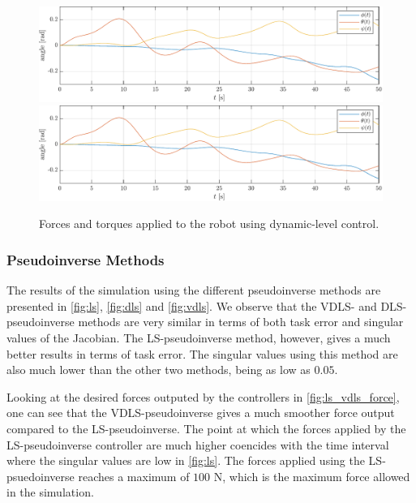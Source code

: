 \begin{figure}[h!]
    \centering
    \includegraphics[page=7,width=\linewidth]{assets/results/dynamic/plot.pdf}
    \includegraphics[page=8,width=\linewidth]{assets/results/dynamic/plot.pdf}
    \caption{Forces and torques applied to the robot using dynamic-level control.}
    \label{fig:dyn:forces}
\end{figure}

\subsubsection{Pseudoinverse Methods}

The results of the simulation using the different pseudoinverse methods are presented
in \autoref{fig:ls}, \autoref{fig:dls} and \autoref{fig:vdls}. We observe that the
VDLS- and DLS-pseudoinverse methods are very similar in terms of both task error and
singular values of the Jacobian. The LS-pseudoinverse method, however, gives a much
better results in terms of task error. The singular values using this method are
also much lower than the other two methods, being as low as $0.05$.

Looking at the desired forces outputed by the controllers in \autoref{fig:ls_vdls_force},
one can see that the VDLS-pseudoinverse gives a much smoother force output compared
to the LS-pseudoinverse. The point at which the forces applied by the LS-pseudoinverse
controller are much higher coencides with the time interval where the singular values
are low in \autoref{fig:ls}. The forces applied using the LS-psuedoinverse reaches
a maximum of $100$ N, which is the maximum force allowed in the simulation.


